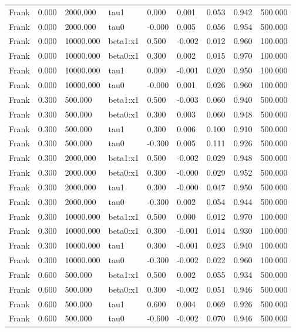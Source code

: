 \begin{table}[htbp]
\begin{tabular}{lllllllll}
Frank & 0.000 & 2000.000 & tau1 & 0.000 & 0.001 & 0.053 & 0.942 & 500.000 \\
Frank & 0.000 & 2000.000 & tau0 & -0.000 & 0.005 & 0.056 & 0.954 & 500.000 \\
Frank & 0.000 & 10000.000 & beta1:x1 & 0.500 & -0.002 & 0.012 & 0.960 & 100.000 \\
Frank & 0.000 & 10000.000 & beta0:x1 & 0.300 & 0.002 & 0.015 & 0.970 & 100.000 \\
Frank & 0.000 & 10000.000 & tau1 & 0.000 & -0.001 & 0.020 & 0.950 & 100.000 \\
Frank & 0.000 & 10000.000 & tau0 & -0.000 & 0.001 & 0.026 & 0.960 & 100.000 \\
Frank & 0.300 & 500.000 & beta1:x1 & 0.500 & -0.003 & 0.060 & 0.940 & 500.000 \\
Frank & 0.300 & 500.000 & beta0:x1 & 0.300 & 0.003 & 0.060 & 0.948 & 500.000 \\
Frank & 0.300 & 500.000 & tau1 & 0.300 & 0.006 & 0.100 & 0.910 & 500.000 \\
Frank & 0.300 & 500.000 & tau0 & -0.300 & 0.005 & 0.111 & 0.926 & 500.000 \\
Frank & 0.300 & 2000.000 & beta1:x1 & 0.500 & -0.002 & 0.029 & 0.948 & 500.000 \\
Frank & 0.300 & 2000.000 & beta0:x1 & 0.300 & -0.000 & 0.029 & 0.952 & 500.000 \\
Frank & 0.300 & 2000.000 & tau1 & 0.300 & -0.000 & 0.047 & 0.950 & 500.000 \\
Frank & 0.300 & 2000.000 & tau0 & -0.300 & 0.002 & 0.054 & 0.944 & 500.000 \\
Frank & 0.300 & 10000.000 & beta1:x1 & 0.500 & 0.000 & 0.012 & 0.970 & 100.000 \\
Frank & 0.300 & 10000.000 & beta0:x1 & 0.300 & -0.001 & 0.014 & 0.930 & 100.000 \\
Frank & 0.300 & 10000.000 & tau1 & 0.300 & -0.001 & 0.023 & 0.940 & 100.000 \\
Frank & 0.300 & 10000.000 & tau0 & -0.300 & -0.002 & 0.022 & 0.960 & 100.000 \\
Frank & 0.600 & 500.000 & beta1:x1 & 0.500 & 0.002 & 0.055 & 0.934 & 500.000 \\
Frank & 0.600 & 500.000 & beta0:x1 & 0.300 & -0.002 & 0.051 & 0.946 & 500.000 \\
Frank & 0.600 & 500.000 & tau1 & 0.600 & 0.004 & 0.069 & 0.926 & 500.000 \\
Frank & 0.600 & 500.000 & tau0 & -0.600 & -0.002 & 0.070 & 0.946 & 500.000 \\

\end{tabular}
\end{table}
